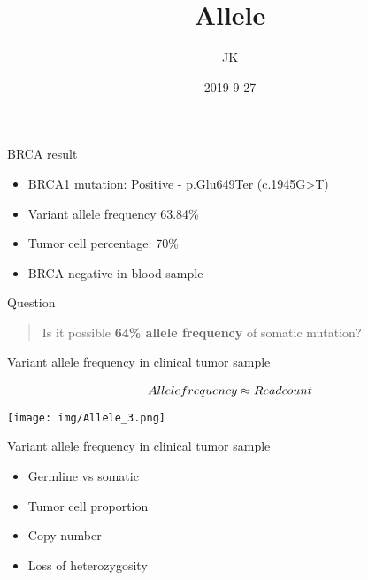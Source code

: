 \documentclass[
  ignorenonframetext,
]{beamer}
\title{Allele}
\author{JK}
\date{2019 9 27}
\providecommand{\tightlist}{%
  \setlength{\itemsep}{0pt}\setlength{\parskip}{0pt}}
\begin{document}
\frame{\titlepage}

\begin{frame}{BRCA result}
\protect\hypertarget{brca-result}{}

\begin{itemize}
\tightlist
\item
  BRCA1 mutation: Positive - p.Glu649Ter (c.1945G\textgreater{}T)\\
\item
  Variant allele frequency 63.84\%\\
\item
  Tumor cell percentage: 70\%\\
\item
  BRCA negative in blood sample
\end{itemize}

\end{frame}

\begin{frame}{Question}
\protect\hypertarget{question}{}

\begin{quote}
Is it possible \textbf{64\% allele frequency} of somatic mutation?
\end{quote}

\end{frame}

\begin{frame}{Variant allele frequency in clinical tumor sample}
\protect\hypertarget{variant-allele-frequency-in-clinical-tumor-sample}{}

\[Allele \space frequency \approx Read \space count\]
\texttt{[image: img/Allele\_3.png]}

\end{frame}

\begin{frame}{Variant allele frequency in clinical tumor sample}
\protect\hypertarget{variant-allele-frequency-in-clinical-tumor-sample-1}{}

\begin{itemize}
\tightlist
\item
  Germline vs somatic\\
\item
  Tumor cell proportion\\
\item
  Copy number\\
\item
  Loss of heterozygosity
\end{itemize}

\end{frame}
\end{document}
